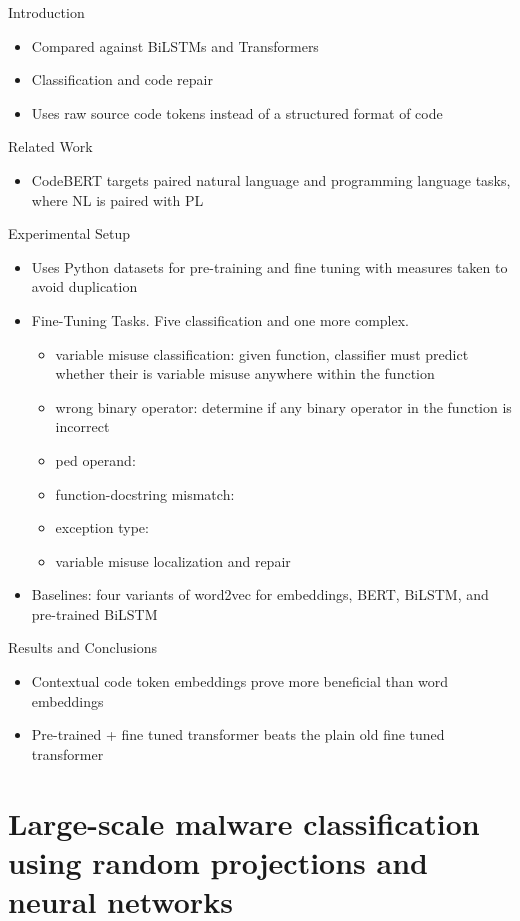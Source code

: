 \documentclass{article}
\begin{document}
Introduction
\begin{itemize}
\item Compared against BiLSTMs and Transformers
\item Classification and code repair
\item Uses raw source code tokens instead of a structured format of code
\end{itemize}
Related Work
\begin{itemize}
\item CodeBERT targets paired natural language and programming language tasks, where NL is paired with PL
\end{itemize}
Experimental Setup
\begin{itemize}
\item Uses Python datasets for pre-training and fine tuning with measures taken to avoid duplication
\item Fine-Tuning Tasks. Five classification and one more complex.
\begin{itemize}
	\item variable misuse classification: given function, classifier must predict whether their is variable misuse anywhere within the function
	\item wrong binary operator: determine if any binary operator in the function is incorrect
	\item ped operand: 
	\item function-docstring mismatch:
	\item exception type: 
	\item variable misuse localization and repair
\end{itemize}
\item Baselines: four variants of word2vec for embeddings, BERT, BiLSTM, and pre-trained BiLSTM
\end{itemize}
Results and Conclusions
\begin{itemize}
\item Contextual code token embeddings prove more beneficial than word embeddings
\item Pre-trained + fine tuned transformer beats the plain old fine tuned transformer
\end{itemize}

\pagebreak


\section*{Large-scale malware classification using random projections and neural networks}
\end{document}
